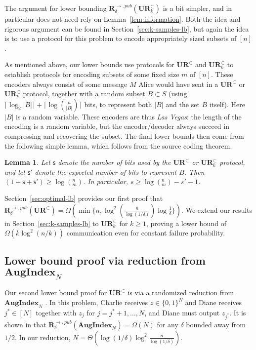 \documentclass[11pt]{article}
\newtheorem{lemma}{Lemma}
\newcommand{\aug}{\mathbf{AugIndex}\xspace}
\newcommand{\s}{\textsf{s}\xspace}
\newcommand{\ur}{\mathbf{UR}\xspace}
\newcommand{\randcom}{\mathbf{R}}
\begin{document}
The argument for lower bounding $\randcom^{\rightarrow,pub}_\delta(\ur_k^\subset)$ is a bit simpler, and in particular does not need rely on Lemma~\ref{lem:information}. Both the idea and rigorous argument can be found in Section~\ref{sec:k-samples-lb}, but again the idea is to use a protocol for this problem to encode appropriately sized subsets of $[n]$.
 
As mentioned above, our lower bounds use protocols for $\ur^\subset$ and $\ur^\subset_k$ to establish protocols for encoding subsets of some fixed size $m$ of $[n]$. These encoders always consist of some message $M$ Alice would have sent in a $\ur^\subset$ or $\ur^\subset_k$ protocol, together with a random subset $B\subset S$ (using $\lceil \log_2|B|\rceil + \lceil\log{n\choose |B|}\rceil$ bits, to represent both $|B|$ and the set $B$ itself). Here $|B|$ is a random variable. These encoders are thus {\em Las Vegas}: the length of the encoding is a random variable, but the encoder/decoder always succeed in compressing and recovering the subset. The final lower bounds then come from the following simple lemma, which follows from the source coding theorem. 

\begin{lemma} \label{lemma:lb-meta}
  Let $\s$ denote the number of bits used by the $\ur^\subset$ or $\ur^\subset_k$ protocol, and let $\s'$ denote the expected number of bits to represent $B$. Then $(1+\s+\s') \ge \log (^n_m)$. In particular, $s \ge \log(^n_m) - s' - 1$.
\end{lemma}

Section~\ref{sec:optimal-lb} provides our first proof that $\randcom^{\rightarrow,pub}_\delta(\ur^\subset) = \Omega(\min\{n, \log^2(\frac n{\log(1/\delta)}) \log \frac{1}{\delta}\})$. We extend our results in Section~\ref{sec:k-samples-lb} to $\ur_k^\subset$ for $k\ge 1$, proving a lower bound of $\Omega(k\log^2(n/k))$ communication even for constant failure probability.

\subsection{Lower bound proof via reduction from $\aug_N$}

Our second lower bound proof for $\ur^\subset$ is via a randomized reduction from $\aug_N$ \cite{MiltersenNSW98}. In this problem, Charlie receives $z\in\{0,1\}^N$ and Diane receives $j^*\in[N]$ together with $z_j$ for $j=j^*+1,\ldots,N$, and Diane must output $z_{j^*}$. It is shown in \cite{MiltersenNSW98} that $\randcom^{\rightarrow, pub}_\delta(\aug_N) = \Omega(N)$ for any $\delta$ bounded away from $1/2$. In our reduction, $N = \Theta(\log(1/\delta)\log^2\frac n{\log(1/\delta)})$.
\end{document}
